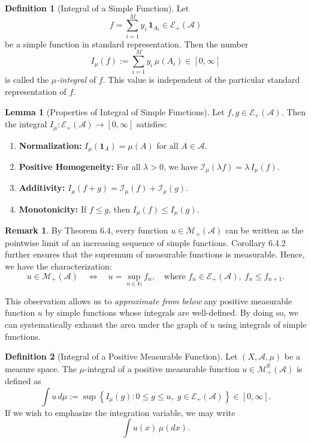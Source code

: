 \documentclass[12pt]{article}
\theoremstyle{definition}
\newtheorem{definition}{Definition}[section]
\newtheorem{lemma}[theorem]{Lemma}
\newtheorem{remark}{Remark}[section]
\begin{document}
\medskip
\begin{definition}[Integral of a Simple Function]
Let 
\[
f = \sum_{i=1}^{M} y_i \, \mathbf{1}_{A_i} \in \mathcal{E}_+(\mathcal{A})
\]
be a simple function in standard representation. Then the number
\[
I_\mu(f) := \sum_{i=1}^{M} y_i \, \mu(A_i) \in [0, \infty]
\]
is called the \emph{\( \mu \)-integral} of \( f \).  
This value is independent of the particular standard representation of \( f \).
\end{definition}

\medskip
\begin{lemma}[Properties of Integral of Simple Functions]
Let \( f, g \in \mathcal{E}_+(\mathcal{A}) \). Then the integral \( I_\mu : \mathcal{E}_+(\mathcal{A}) \to [0, \infty] \) satisfies:
\begin{enumerate}[label=(\roman*)]
    \item \textbf{Normalization:} \( I_\mu(\mathbf{1}_A) = \mu(A) \) for all \( A \in \mathcal{A} \).
    \item \textbf{Positive Homogeneity:} For all \( \lambda > 0 \), we have \( \mathcal{I}_\mu(\lambda f) = \lambda \, I_\mu(f) \).
    \item \textbf{Additivity:} \( I_\mu(f + g) = \mathcal{I}_\mu(f) + \mathcal{I}_\mu(g) \).
    \item \textbf{Monotonicity:} If \( f \leq g \), then \( I_\mu(f) \leq I_\mu(g) \).
\end{enumerate}
\end{lemma}

\medskip
\begin{remark}
By Theorem 6.4, every function \( u \in \mathcal{M}_+(\mathcal{A}) \) can be written as the pointwise limit of an increasing sequence of simple functions. Corollary 6.4.2 further ensures that the supremum of measurable functions is measurable. Hence, we have the characterization:
\[
u \in \mathcal{M}_+(\mathcal{A}) \quad \Longleftrightarrow \quad u = \sup_{n \in \mathbb{N}} f_n, \quad \text{where } f_n \in \mathcal{E}_+(\mathcal{A}), \; f_n \leq f_{n+1}.
\]

This observation allows us to \emph{approximate from below} any positive measurable function \( u \) by simple functions whose integrals are well-defined. By doing so, we can systematically exhaust the area under the graph of \( u \) using integrals of simple functions.
\end{remark}

\medskip
\begin{definition}[Integral of a Positive Measurable Function]
Let \( (X, \mathcal{A}, \mu) \) be a measure space. The \(\mu\)-integral of a positive measurable function \( u \in \mathcal{M}_+^{\overline{\mathbb{R}}}(\mathcal{A}) \) is defined as
\[
\int u \, d\mu := \sup \left\{ I_\mu(g) : 0 \leq g \leq u,\; g \in \mathcal{E}_+(\mathcal{A}) \right\} \in [0, \infty].
\]
If we wish to emphasize the integration variable, we may write
\[
\int u(x) \, \mu(dx).
\]
\end{definition}
\end{document}
